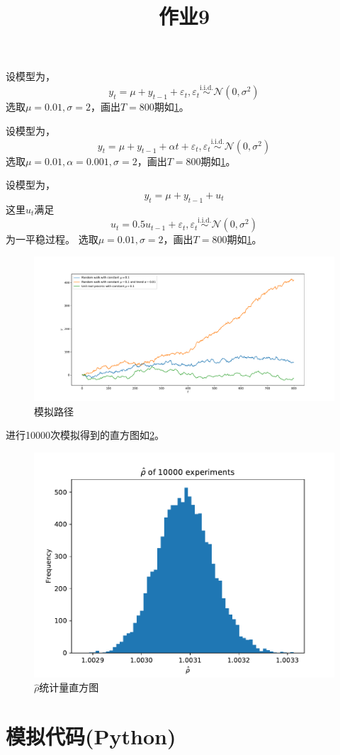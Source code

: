 \documentclass[cn]{homework}
\title{作业9}
\begin{document}
    \maketitle
    \problem[带常数项的随机游走过程]
    设模型为，
    \[y_t=\mu+y_{t-1}+\varepsilon_t,
    \varepsilon_t\overset{\text{i.i.d.}}\sim\mathcal N(0,\sigma^2)\]
    选取$\mu=0.01,\sigma=2$，画出$T=800$期如\cref{fig:seq}。

    \problem[带常数和趋势项的随机游走]
    设模型为，
    \[y_t=\mu+y_{t-1}+\alpha t+\varepsilon_t,
    \varepsilon_t\overset{\text{i.i.d.}}\sim\mathcal N(0,\sigma^2)\]
    选取$\mu=0.01,\alpha=0.001,\sigma=2$，画出$T=800$期如\cref{fig:seq}。


    \problem[带常数项的单位根过程]
    设模型为，
    \[y_t=\mu+y_{t-1}+u_t\]
    这里$u_t$满足 
    \[u_t=0.5u_{t-1}+\varepsilon_t,
    \varepsilon_t\overset{\text{i.i.d.}}\sim\mathcal N(0,\sigma^2)\]
    为一平稳过程。
    选取$\mu=0.01,\sigma=2$，画出$T=800$期如\cref{fig:seq}。

    \begin{figure}[h]
        \centering
        \includegraphics[width=\textwidth]{seq}
        \caption{模拟路径}
        \label{fig:seq}
    \end{figure}

    \problem[第二种情况rho统计量]
    进行10000次模拟得到的直方图如\cref{fig:rho}。
    \begin{figure}[h]
        \centering
        \includegraphics[width=\textwidth]{rho}
        \caption{$\hat\rho$统计量直方图}
        \label{fig:rho}
    \end{figure}

    \newpage
    \appendix
    \section{模拟代码(Python)}
    
\end{document}
